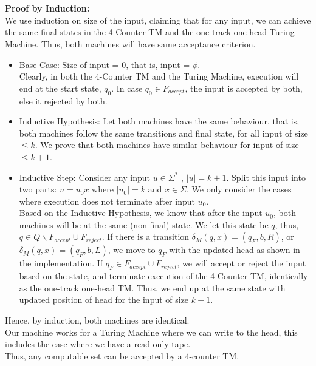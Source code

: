 \documentclass[12pt,a4paper]{article}
\begin{document}
\\
\\ \textbf{Proof by Induction:}
\\We use induction on size of the input, claiming that for any input, we can achieve the same final states in the 4-Counter TM and the one-track one-head Turing Machine. Thus, both machines will have same acceptance criterion.
\begin{itemize}
    \item Base Case: Size of input = $0$, that is, input = $\phi$.
    \\Clearly, in both the 4-Counter TM and the Turing Machine, execution will end at the start state, $q_0$. In case $q_0 \in F_{accept}$, the input is accepted by both, else it rejected by both.
    \item Inductive Hypothesis: Let both machines have the same behaviour, that is, both machines follow the same transitions and final state, for all input of size $\leq k$. We prove that both machines have similar behaviour for input of size $\leq k + 1$.
    \item Inductive Step: Consider any input $u \in \Sigma^*$ , $\vert u \vert = k + 1$. Split this input into two parts: $u = u_0x$ where $\vert u_0 \vert = k$ and $x \in \Sigma$. We only consider the cases where execution does not terminate after input $u_0$.
    \\Based on the Inductive Hypothesis, we know that after the input $u_0$, both machines will be at the same (non-final) state. We let this state be $q$, thus, $q \in Q \backslash F_{accept} \cup F_{reject}$. If there is a transition $\delta_M (q,x) = (q_F,b,R)$, or $\delta_M (q,x) = (q_F,b,L)$, we move to $q_F$ with the updated head as shown in the implementation. If $q_F \in F_{accept} \cup F_{reject}$, we will accept or reject the input based on the state, and terminate execution of the 4-Counter TM, identically as the one-track one-head TM. Thus, we end up at the same state with updated position of head for the input of size $k + 1$.
\end{itemize}
Hence, by induction, both machines are identical.
\\Our machine works for a Turing Machine where we can write to the head, this includes the case where we have a read-only tape.
\\Thus, any computable set can be accepted by a 4-counter TM.
\end{document}
